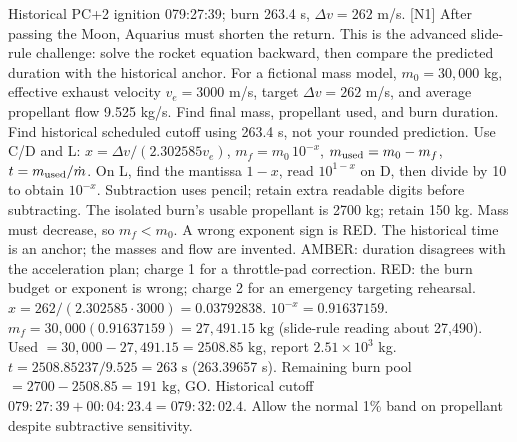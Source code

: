 {Historical PC+2 ignition 079:27:39; burn 263.4 s, \(\Delta v=262\) m/s. [N1]}
{After passing the Moon, Aquarius must shorten the return.
This is the advanced slide-rule challenge: solve the rocket equation
backward, then compare the predicted duration with the historical anchor.}
{For a fictional mass model, \(m_0=30{,}000\) kg,
effective exhaust velocity \(v_e=3000\) m/s, target \(\Delta v=262\) m/s,
and average propellant flow 9.525 kg/s.
Find final mass, propellant used, and burn duration.
Find historical scheduled cutoff using 263.4 s, not your rounded prediction.}
{Use C/D and L:
\(x=\Delta v/(2.302585v_e)\),
\(m_f=m_0\,10^{-x}\),
\(m_{\rm used}=m_0-m_f\), \(t=m_{\rm used}/\dot m\).
On L, find the mantissa \(1-x\), read \(10^{1-x}\) on D,
then divide by 10 to obtain \(10^{-x}\).
Subtraction uses pencil; retain extra readable digits before subtracting.}
{The isolated burn's usable propellant is 2700 kg; retain 150 kg.
Mass must decrease, so \(m_f<m_0\). A wrong exponent sign is RED.
The historical time is an anchor; the masses and flow are invented.}
{AMBER: duration disagrees with the acceleration plan; charge 1 for a
throttle-pad correction. RED: the burn budget or exponent is wrong;
charge 2 for an emergency targeting rehearsal.}
{\(x=262/(2.302585\cdot3000)=0.03792838\).
\(10^{-x}=0.91637159\).
\(m_f=30{,}000(0.91637159)
=\boxed{27{,}491.15\text{ kg}}\) (slide-rule reading about 27,490).
Used \(=30{,}000-27{,}491.15
=\boxed{2508.85\text{ kg}}\), report \(2.51\times10^3\) kg.
\(t=2508.85237/9.525=\boxed{263\text{ s}}\)
(263.39657 s).
Remaining burn pool \(=2700-2508.85
=\boxed{191\text{ kg}}\), GO.
Historical cutoff \(079{:}27{:}39+00{:}04{:}23.4
=\boxed{079{:}32{:}02.4}\).
Allow the normal 1\% band on propellant despite subtractive sensitivity.}

